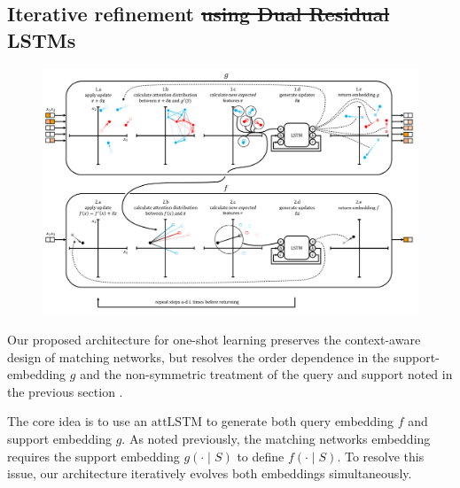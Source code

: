 \documentclass[journal=jacsat,manuscript=article]{achemso}
\providecommand{\DIFaddtex}[1]{{\protect\color{blue}\uwave{#1}}} %
\providecommand{\DIFdeltex}[1]{{\protect\color{red}\sout{#1}}}                      %
\providecommand{\DIFaddbegin}{} %
\providecommand{\DIFaddend}{} %
\providecommand{\DIFdelbegin}{} %
\providecommand{\DIFdelend}{} %
\providecommand{\DIFadd}[1]{\texorpdfstring{\DIFaddtex{#1}}{#1}} %
\providecommand{\DIFdel}[1]{\texorpdfstring{\DIFdeltex{#1}}{}} %
\begin{document}


\subsection{Iterative refinement \DIFdelbegin \DIFdel{using Dual Residual }\DIFdelend LSTMs}
\DIFaddbegin \begin{figure}[h]
\includegraphics[width=\textwidth]{resiembedding_graphic_v2.png}
\label{fig:resiembed}
\end{figure}
\DIFaddend 

Our proposed architecture for one-shot learning preserves the context-aware design of matching networks, but resolves the order dependence in the support-embedding $g$ and the non-symmetric treatment of the query and support noted in the previous section \DIFaddbegin \DIFadd{(Figure~\ref{fig:resiembed})}\DIFaddend .

The core idea is to use an $\text{attLSTM}$ to generate both query embedding $f$ and support embedding $g$. As noted previously, the matching networks \cite{vinyals2016matching} embedding requires the support embedding $g(\cdot \mid S)$ to define $f(\cdot \mid S)$. To resolve this issue, our architecture iteratively evolves both embeddings simultaneously.
\end{document}
